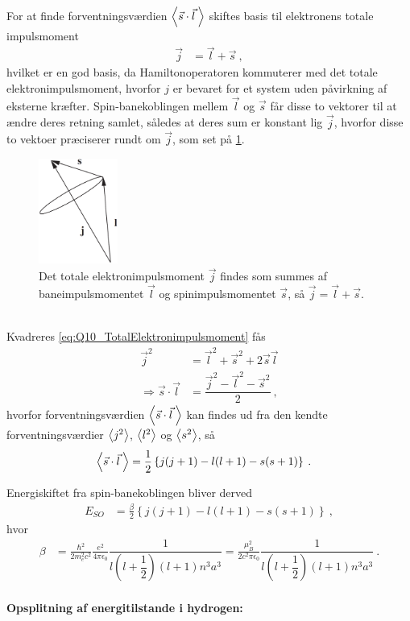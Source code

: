 For at finde forventningsværdien $\Braket{\Vec{s} \cdot \Vec{l} \: }$ skiftes basis til elektronens totale impulsmoment
\begin{align} \label{eq:Q10_TotalElektronimpulsmoment}
    \Vec{j} &= \Vec{l} + \Vec{s} \: ,
\end{align}
hvilket er en god basis, da Hamiltonoperatoren kommuterer med det totale elektronimpulsmoment, hvorfor $j$ er bevaret for et system uden påvirkning af eksterne kræfter. Spin-banekoblingen mellem $\Vec{l}$ og $\Vec{s}$ får disse to vektorer til at ændre deres retning samlet, således at deres sum er konstant lig $\Vec{j}$, hvorfor disse to vektoer præciserer rundt om $\Vec{j}$, som set på \cref{fig:Q10_TotalElektronimpulsmoment}.
\begin{figure}[!h]
    \centering
    \includegraphics[width=0.23\textwidth]{Q10/images/AtomicQuantumNumberJ.PNG}
    \caption{Det totale elektronimpulsmoment $\Vec{j}$ findes som summes af baneimpulsmomentet $\Vec{l}$ og spinimpulsmomentet $\Vec{s}$, så $\Vec{j} = \Vec{l} + \Vec{s}$.}
    \label{fig:Q10_TotalElektronimpulsmoment}
\end{figure}\\
Kvadreres \cref{eq:Q10_TotalElektronimpulsmoment} fås
\begin{align}
    \Vec{j}^2 &= \Vec{l}^2 + \Vec{s}^2 + 2\Vec{s}\Vec{l} \nonumber\\
    \Rightarrow \Vec{s} \cdot \Vec{l} &= \dfrac{\Vec{j}^2 - \Vec{l}^2 - \Vec{s}^2}{2} \: ,
\end{align}
hvorfor forventningsværdien $\Braket{\Vec{s} \cdot \Vec{l} \: }$ kan findes ud fra den kendte forventningsværdier $\Braket{j^2}$, $\Braket{l^2}$ og $\Braket{s^2}$, så
\begin{align}
    \Braket{\Vec{s} \cdot \Vec{l} \: } &= \frac{1}{2}\left\{j(j+1) - l(l+1) - s(s+1)\right\} \: .
\end{align}

Energiskiftet fra spin-banekoblingen bliver derved
\begin{align} \label{eq:Q10_EnergiskiftSpinOrbitForHydrogen}
    E_{SO} &= \frac{\beta}{2} \left\{j(j+1) - l(l+1) - s(s+1)\right\} \: ,
\end{align}
hvor
\begin{align}
    \beta &= \frac{\hbar^2}{2m_e^2c^2} \frac{e^2}{4\pi\epsilon_0} \dfrac{1}{l\left(l+\dfrac{1}{2}\right)\left(l + 1\right) n^3a^3} = \frac{\mu_B^2}{2c^2\pi\epsilon_0} \dfrac{1}{l\left(l+\dfrac{1}{2}\right)\left(l + 1\right) n^3a^3} \: .
\end{align}

\paragraph{Opsplitning af energitilstande i hydrogen:}